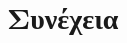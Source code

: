 \documentclass[a4paper,table]{report}
\begin{document}
\begin{enumerate}

 \end{enumerate}


\pagebreak


\section*{Συνέχεια}
\end{document}
